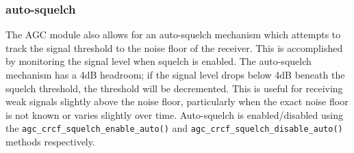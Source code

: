 \subsubsection{auto-squelch}
\label{module:agc:squelch:auto}
The AGC module also allows for an auto-squelch mechanism which attempts to
track the signal threshold to the noise floor of the receiver.
This is accomplished by monitoring the signal level when squelch is enabled.
The auto-squelch mechanism has a 4dB headroom; if the signal level drops below
4dB beneath the squelch threshold, the threshold will be decremented.
This is useful for receiving weak signals slightly above the noise floor,
particularly when the exact noise floor is not known or varies slightly over
time.
Auto-squelch is enabled/disabled using the
{\tt agc\_crcf\_squelch\_enable\_auto()} and 
{\tt agc\_crcf\_squelch\_disable\_auto()} methods respectively.

